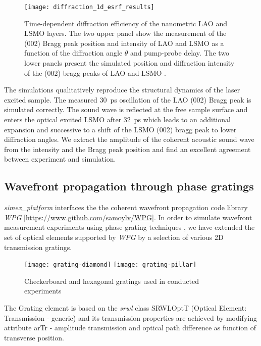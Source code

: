 \documentclass[10pt]{scrartcl}
\begin{document}
\begin{figure}[ht]
    \begin{center}
        \texttt{[image: diffraction\_1d\_esrf\_results]}
    \end{center}
    \caption{Time-dependent diffraction efficiency of the nanometric LAO and
      LSMO layers. The two upper panel show the measurement of the (002) Bragg
      peak position and intensity of LAO and LSMO as a function of the
      diffraction angle $\theta$ and pump-probe delay. The two lower panels
      present the simulated position and diffraction intensity of the (002)
      bragg peaks of LAO and LSMO \cite{Schick2014}.}
    \label{fig:coherent_acoustic_exp_vs_sim}
\end{figure}

The simulations qualitatively reproduce the structural dynamics of the laser
excited sample. The measured \SI{30}{\pico\second} oscillation of the LAO (002) Bragg peak is
simulated correctly. The sound wave is reflected at the free sample surface and
enters the optical excited LSMO after \SI{32}{\pico\second} which leads to an additional
expansion and successive to a shift of the LSMO (002) bragg peak to lower
diffraction angles. We extract the amplitude of the coherent acoustic sound wave
from the intensity and the Bragg peak position and find an excellent agreement
between experiment and  simulation.

\subsection{Wavefront propagation through phase gratings}
\label{sec:wpg_phasegrating}
\textit{simex\_platform} interfaces the the coherent wavefront propagation code
library \textit{WPG} [\url{https://www.github.com/samoylv/WPG}]. In order to
simulate wavefront measurement experiments using phase grating techniques
\cite{Weitkamp2005}, we have extended the set of optical elements supported by \textit{WPG}
by a selection of various 2D transmission gratings.
%
\begin{figure}[ht]
	\begin{center}
		\texttt{[image: grating-diamond]}
		\texttt{[image: grating-pillar]}
	\end{center}
	\caption{Checkerboard and hexagonal gratings used in conducted experiments}
	\label{fig:lm_gratings}
\end{figure}
%
The Grating element is based on the \textit{srwl} class SRWLOptT (Optical Element: Transmission - generic) and its transmission properties are achieved by modifying attribute arTr - amplitude transmission and optical path difference as function of transverse position.
\end{document}

